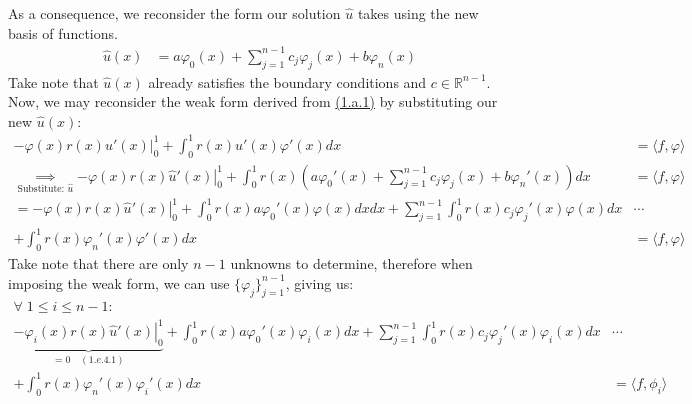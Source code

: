 \documentclass[]{article}
\begin{document}
        As a consequence, we reconsider the form our solution $\hat{u}$ takes using the new basis of functions.
        \begin{align*}\tag{1.e.2}\label{eqn:1.e.2}
            \hat{u}(x) &= 
            a\varphi_0(x) + \sum_{j = 1}^{n - 1}c_j\varphi_j(x) + b\varphi_n(x)
        \end{align*}
        Take note that $\hat{u}(x)$ already satisfies the boundary conditions and $c\in \mathbb{R}^{n - 1}$. Now, we may reconsider the weak form derived from \hyperref[eqn:1.a.1]{(1.a.1)} by substituting our new $\hat{u}(x)$: 
        \begin{align*}\tag{1.e.3}\label{eqn:1.e.3}
            -\left.\varphi(x)r(x)u'(x)\right|_0^1
            +
            \int_{0}^{1} 
                r(x)u'(x)\varphi'(x)
            dx
            &= \langle f, \varphi\rangle
            \\
            \underset{\text{Substitute: } \hat{u}}{\implies}
            \left.
            -\varphi(x)r(x)\hat{u}'(x)
            \right|_0^1
            + 
            \int_{0}^{1} 
                r(x)\left(
                        a\varphi_0'(x)
                        + 
                        \sum_{j = 1}^{n - 1} c_j\varphi_j(x)
                        + 
                        b\varphi_n'(x)
                    \right)
            dx
            &= 
            \langle f, \varphi\rangle
            \\ 
            =
            \left.
            -\varphi(x)r(x)\hat{u}'(x)
            \right|_0^1
            + 
            \int_{0}^{1} 
                r(x)a\varphi_0'(x)\varphi(x)dx
            dx
            + 
            \sum_{j = 1}^{n - 1}
                \int_{0}^{1} 
                    r(x)c_j\varphi_j'(x)\varphi(x)
                dx&\cdots
            \\
            + 
            \int_{0}^{1}r(x)\varphi_n'(x)\varphi'(x) dx
            &= 
            \langle f, \varphi\rangle
        \end{align*}
        Take note that there are only $n - 1$ unknowns to determine, therefore when imposing the weak form, we can use $\{\varphi_j\}_{j = 1}^{n - 1}$, giving us:
        \begin{align*}\tag{1.e.4}\label{eqn:1.e.4}
            \forall\; 1 \le i \le n - 1: \; \hspace{10em}& 
            \\
            \underbrace{\left.
            -\varphi_i(x)r(x)\hat{u}'(x)
            \right|_0^1}_{=0 \quad(1.e.4.1)}
            + 
            \int_{0}^{1} 
                r(x)a\varphi_0'(x)\varphi_i(x)
            dx
            + 
            \sum_{j = 1}^{n - 1}
                \int_{0}^{1} 
                    r(x)c_j\varphi_j'(x)\varphi_i(x)
                dx&\cdots
            \\
            + 
            \int_{0}^{1}r(x)\varphi_n'(x)\varphi_i'(x) dx
            &= \langle f, \phi_i\rangle
        \end{align*}
\end{document}
